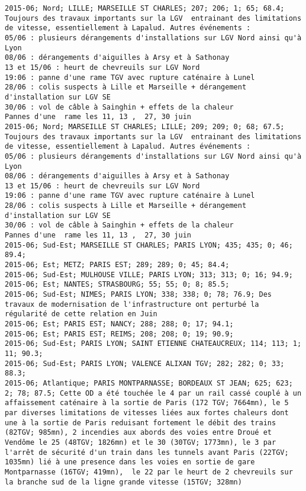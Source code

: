 \documentclass{article}
\begin{document}
\begin{Verbatim}[commandchars=\\\{\}]
2015-06; Nord; LILLE; MARSEILLE ST CHARLES; 207; 206; 1; 65; 68.4; Toujours des travaux importants sur la LGV  entrainant des limitations de vitesse, essentiellement à Lapalud. Autres événements :
05/06 : plusieurs dérangements d'installations sur LGV Nord ainsi qu'à Lyon
08/06 : dérangements d'aiguilles à Arsy et à Sathonay 
13 et 15/06 : heurt de chevreuils sur LGV Nord
19:06 : panne d'une rame TGV avec rupture caténaire à Lunel
28/06 : colis suspects à Lille et Marseille + dérangement d'installation sur LGV SE
30/06 : vol de câble à Sainghin + effets de la chaleur
Pannes d'une  rame les 11, 13 ,  27, 30 juin
2015-06; Nord; MARSEILLE ST CHARLES; LILLE; 209; 209; 0; 68; 67.5; Toujours des travaux importants sur la LGV  entrainant des limitations de vitesse, essentiellement à Lapalud. Autres événements :
05/06 : plusieurs dérangements d'installations sur LGV Nord ainsi qu'à Lyon
08/06 : dérangements d'aiguilles à Arsy et à Sathonay 
13 et 15/06 : heurt de chevreuils sur LGV Nord
19:06 : panne d'une rame TGV avec rupture caténaire à Lunel
28/06 : colis suspects à Lille et Marseille + dérangement d'installation sur LGV SE
30/06 : vol de câble à Sainghin + effets de la chaleur
Pannes d'une  rame les 11, 13 ,  27, 30 juin
2015-06; Sud-Est; MARSEILLE ST CHARLES; PARIS LYON; 435; 435; 0; 46; 89.4; 
2015-06; Est; METZ; PARIS EST; 289; 289; 0; 45; 84.4; 
2015-06; Sud-Est; MULHOUSE VILLE; PARIS LYON; 313; 313; 0; 16; 94.9; 
2015-06; Est; NANTES; STRASBOURG; 55; 55; 0; 8; 85.5; 
2015-06; Sud-Est; NIMES; PARIS LYON; 338; 338; 0; 78; 76.9; Des travaux de modernisation de l'infrastructure ont perturbé la régularité de cette relation en Juin
2015-06; Est; PARIS EST; NANCY; 288; 288; 0; 17; 94.1; 
2015-06; Est; PARIS EST; REIMS; 208; 208; 0; 19; 90.9; 
2015-06; Sud-Est; PARIS LYON; SAINT ETIENNE CHATEAUCREUX; 114; 113; 1; 11; 90.3; 
2015-06; Sud-Est; PARIS LYON; VALENCE ALIXAN TGV; 282; 282; 0; 33; 88.3; 
2015-06; Atlantique; PARIS MONTPARNASSE; BORDEAUX ST JEAN; 625; 623; 2; 78; 87.5; Cette OD a été touchée le 4 par un rail cassé couplé à un affaissement caténaire à la sortie de Paris (172 TGV; 7664mn), le 5 par diverses limitations de vitesses liées aux fortes chaleurs dont une à la sortie de Paris reduisant fortement le débit des trains (82TGV; 985mn), 2 incendies aux abords des voies entre Droué et Vendôme le 25 (48TGV; 1826mn) et le 30 (30TGV; 1773mn), le 3 par l'arrêt de sécurité d'un train dans les tunnels avant Paris (22TGV; 1035mn) lié à une presence dans les voies en sortie de gare Montparnasse (16TGV; 419mn),  le 22 par le heurt de 2 chevreuils sur la branche sud de la ligne grande vitesse (15TGV; 328mn)

\end{Verbatim}
\end{document}

